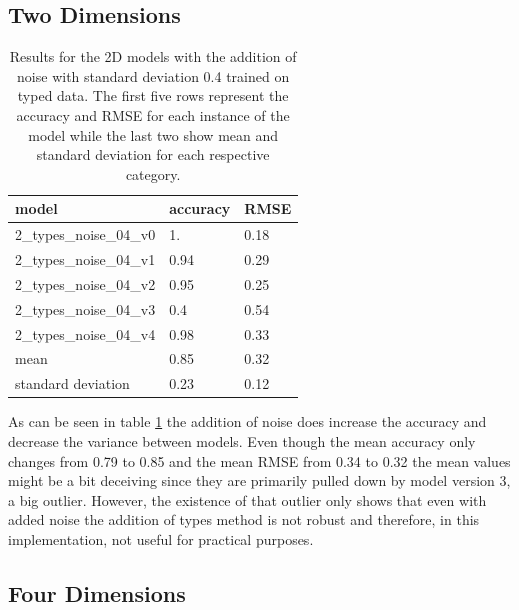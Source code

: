 \subsection{Two Dimensions}

\begin{table}[!htb]
	\centering
	\caption{Results for the 2D models with the addition of noise with standard deviation 0.4 trained on typed data. The first five rows represent the accuracy and RMSE for each instance of the model while the last two show mean and standard deviation for each respective category.}
	\begin{tabularx}{\textwidth}{ X  X  X }
		\hline
		model & accuracy & RMSE \\ 
		\hline
		2\_types\_noise\_04\_v0 & 1.  & 0.18 \\ 
		2\_types\_noise\_04\_v1 & 0.94& 0.29 \\
		2\_types\_noise\_04\_v2 & 0.95& 0.25 \\ 
		2\_types\_noise\_04\_v3 & 0.4 & 0.54 \\ 
		2\_types\_noise\_04\_v4 & 0.98& 0.33 \\ \hline
		mean & 0.85 &  0.32\\
		standard deviation & 0.23 & 0.12\\
		\hline
	\end{tabularx}
	\label{table:2_types_noise_04}
\end{table}

As can be seen in table \ref{table:2_types_noise_04} the addition of noise does increase the accuracy and decrease the variance between models. Even though the mean accuracy only changes from 0.79 to 0.85 and the mean RMSE from 0.34 to 0.32 the mean values might be a bit deceiving since they are primarily pulled down by model version 3, a big outlier. However, the existence of that outlier only shows that even with added noise the addition of types method is not robust and therefore, in this implementation, not useful for practical purposes.

\subsection{Four Dimensions}


